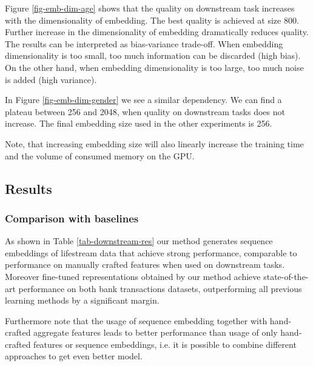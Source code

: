 \documentclass{article}
\begin{document}
Figure \ref{fig-emb-dim-age} shows that the quality on downstream task increases with the dimensionality of embedding. The best quality is achieved at size 800. Further increase in the dimensionality of embedding dramatically reduces quality.
The results can be interpreted as bias-variance trade-off. When embedding dimensionality is too small, too much information can be discarded (high bias). On the other hand, when embedding dimensionality is too large, too much noise is added (high variance).

In Figure \ref{fig-emb-dim-gender} we see a similar dependency. We can find a plateau between 256 and 2048, when quality on downstream tasks does not increase. The final embedding size used in the other experiments is 256.

Note, that increasing embedding size will also linearly increase the training time and the volume of consumed memory on the GPU.

\subsection{Results} \label{sec-res}

\subsubsection{Comparison with baselines} \label{sec-res-baselines}

As shown in Table \ref{tab-downstream-res} our method generates sequence embeddings of lifestream data that achieve strong performance, comparable to performance on manually crafted features when used on downstream tasks. Moreover fine-tuned representations obtained by our method achieve state-of-the-art performance on both bank transactions datasets, outperforming all previous learning methods by a significant margin.

Furthermore note that the usage of sequence embedding together with hand-crafted aggregate features leads to better performance than usage of only hand-crafted features or sequence embeddings, i.e. it is possible to combine different approaches to get even better model.
\end{document}
